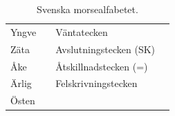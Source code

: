 \begin{table}[H]
\begin{tabular}{llll}
	Yngve   & \MYngve   & Väntatecken            & \MVanta        \\
	Zäta    & \MZata    & Avslutningstecken (SK) & \MAvslutning   \\
	Åke     & \MAke     & Åtskillnadstecken (=)  & \MAtskillnad   \\
	Ärlig   & \MArlig   & Felskrivningstecken    & \MFelskrivning \\
	Östen   & \MOsten   &                        &                \\
\end{tabular}
\normalsize
\caption{Svenska morsealfabetet.}
\label{tab:morsealfabetet}
\end{table}



